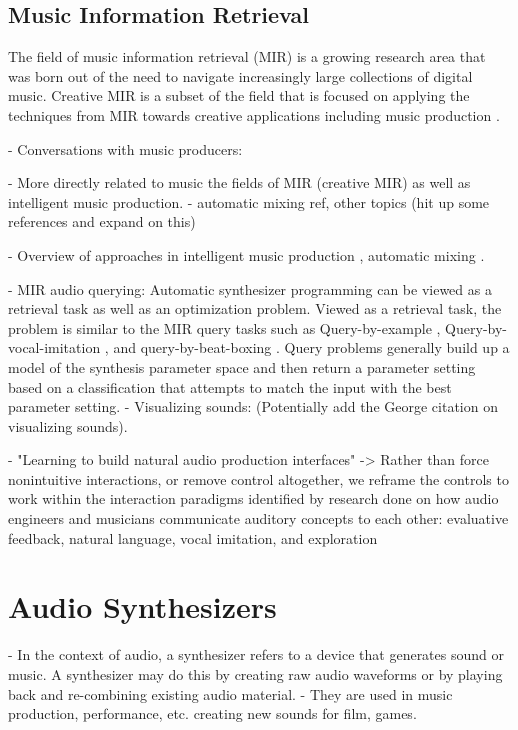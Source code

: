 \subsection{Music Information Retrieval}
The field of music information retrieval (MIR) is a growing research area that was born out of the need to navigate increasingly large collections of digital music. Creative MIR is a subset of the field that is focused on applying the techniques from MIR towards creative applications including music production \cite{humphrey2013brief}.

- Conversations with music producers: \cite{andersen2016conversations}

- More directly related to music the fields of MIR (creative MIR) as well as intelligent music production. - automatic mixing ref, other topics (hit up some references and expand on this)

- Overview of approaches in intelligent music production \cite{moffat2019approaches}, automatic mixing \cite{de2017ten}.

- MIR audio querying: Automatic synthesizer programming can be viewed as a retrieval task as well as an optimization problem. Viewed as a retrieval task, the problem is similar to the MIR query tasks such as Query-by-example \cite{zloof1977query}, Query-by-vocal-imitation \cite{blancas2014sound}, and query-by-beat-boxing \cite{kapur2004query}. Query problems generally build up a model of the synthesis parameter space and then return a parameter setting based on a classification that attempts to match the input with the best parameter setting.
- Visualizing sounds: \cite{wessel1979timbre} (Potentially add the George citation on visualizing sounds).

- \cite{pardo2019learning} "Learning to build natural audio production interfaces" -> Rather than force nonintuitive interactions, or remove control altogether, we reframe the controls to work within the interaction paradigms identified by research done on how audio engineers and musicians communicate auditory concepts to each other: evaluative feedback, natural language, vocal imitation, and exploration

\section{Audio Synthesizers}
- In the context of audio, a synthesizer refers to a device that generates sound or music. A synthesizer may do this by creating raw audio waveforms or by playing back and re-combining existing audio material.
- They are used in music production, performance, etc. creating new sounds for film, games.


